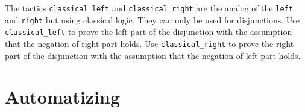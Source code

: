 \begin{coq_example*}
The tactics \texttt{classical\_left} and \texttt{classical\_right} are the analog of the \texttt{left} and \texttt{right} but using classical logic. They can only be used for disjunctions.
Use  \texttt{classical\_left} to prove the left part of the disjunction with the assumption that the negation of right part holds.
Use \texttt{classical\_right} to prove the right part of the disjunction with the assumption that the negation of left part holds.

\section{Automatizing
\label{Automatizing}}

%







\end{coq_example*}
